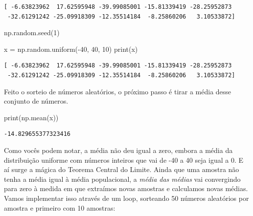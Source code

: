 \documentclass[
  brazilian,
  letterpaper,
  DIV=11,
  numbers=noendperiod]{scrreprt}
\newenvironment{Shaded}{\begin{snugshade}}{\end{snugshade}}
\newcommand{\BuiltInTok}[1]{\textcolor[rgb]{0.00,0.23,0.31}{#1}}
\newcommand{\DecValTok}[1]{\textcolor[rgb]{0.68,0.00,0.00}{#1}}
\newcommand{\NormalTok}[1]{\textcolor[rgb]{0.00,0.23,0.31}{#1}}
\newcommand{\OperatorTok}[1]{\textcolor[rgb]{0.37,0.37,0.37}{#1}}
\begin{document}
\begin{verbatim}
[ -6.63823962  17.62595948 -39.99085001 -15.81339419 -28.25952873
 -32.61291242 -25.09918309 -12.35514184  -8.25860206   3.10533872]
\end{verbatim}

\begin{Shaded}
\begin{Highlighting}[]
\NormalTok{np.random.seed(}\DecValTok{1}\NormalTok{)}

\NormalTok{x }\OperatorTok{=}\NormalTok{ np.random.uniform(}\OperatorTok{{-}}\DecValTok{40}\NormalTok{, }\DecValTok{40}\NormalTok{, }\DecValTok{10}\NormalTok{)}
\BuiltInTok{print}\NormalTok{(x)}
\end{Highlighting}
\end{Shaded}

\begin{verbatim}
[ -6.63823962  17.62595948 -39.99085001 -15.81339419 -28.25952873
 -32.61291242 -25.09918309 -12.35514184  -8.25860206   3.10533872]
\end{verbatim}

Feito o sorteio de números aleatórios, o próximo passo é tirar a média
desse conjunto de números.

\begin{Shaded}
\begin{Highlighting}[]
\BuiltInTok{print}\NormalTok{(np.mean(x))}
\end{Highlighting}
\end{Shaded}

\begin{verbatim}
-14.829655377323416
\end{verbatim}

Como vocês podem notar, a média não deu igual a zero, embora a média da
distribuição uniforme com números inteiros que vai de -40 a 40 seja
igual a 0. E aí surge a mágica do Teorema Central do Limite. Ainda que
uma amostra não tenha a média igual à média populacional, a \emph{média
das médias} vai convergindo para zero à medida em que extraímos novas
amostras e calculamos novas médias. Vamos implementar isso através de um
loop, sorteando 50 números aleatórios por amostra e primeiro com 10
amostras:
\end{document}
